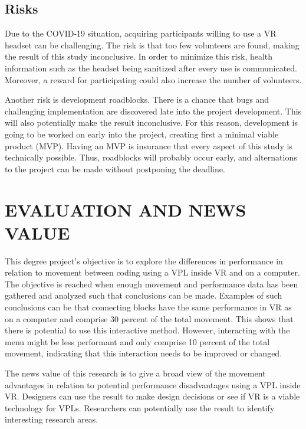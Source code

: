 \documentclass{sigchi}
\begin{document}
\subsection{Risks}
Due to the COVID-19 situation, acquiring participants willing to use a VR headset can be challenging. The risk is that too few volunteers are found, making the result of this study inconclusive. In order to minimize this risk, health information such as the headset being sanitized after every use is communicated. Moreover, a reward for participating could also increase the number of volunteers. 

Another risk is development roadblocks. There is a chance that bugs and challenging implementation are discovered late into the project development. This will also potentially make the result inconclusive. For this reason, development is going to be worked on early into the project, creating first a minimal viable product (MVP). Having an MVP is insurance that every aspect of this study is technically possible. Thus, roadblocks will probably occur early, and alternations to the project can be made without postponing the deadline.

\section{EVALUATION AND NEWS VALUE}
This degree project's objective is to explore the differences in performance in relation to movement between coding using a VPL inside VR and on a computer. The objective is reached when enough movement and performance data has been gathered and analyzed such that conclusions can be made. Examples of such conclusions can be that connecting blocks have the same performance in VR as on a computer and comprise 30 percent of the total movement. This shows that there is potential to use this interactive method. However, interacting with the menu might be less performant and only comprise 10 percent of the total movement,  indicating that this interaction needs to be improved or changed.

The news value of this research is to give a broad view of the movement advantages in relation to potential performance disadvantages using a VPL inside VR. Designers can use the result to make design decisions or see if VR is a viable technology for VPLs. Researchers can potentially use the result to identify interesting research areas.
\end{document}
